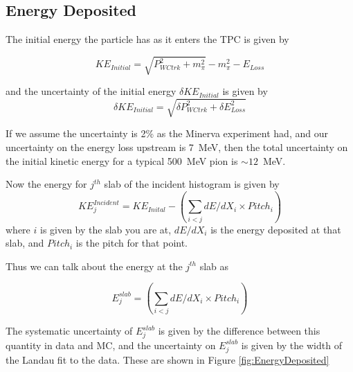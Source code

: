 \subsection{Energy Deposited}\label{sec:Energy}
The initial energy the particle has as it enters the TPC is given by

\begin{equation}
KE_{Initial} = \sqrt{P_{WCtrk}^2 + m_{\pi}^2} - m_{\pi}^2 - E_{Loss}
\end{equation}

and the uncertainty of the initial energy $\delta KE_{Initial}$ is given by
\begin{equation}
\delta KE_{Initial} = \sqrt{\delta P_{WCtrk}^2 + \delta E_{Loss}^2}
\end{equation}

If we assume the uncertainty is 2\% as the Minerva experiment had, and our uncertainty on the energy loss upstream is 7~MeV, then the total uncertainty on the initial kinetic energy for a typical 500~MeV pion is $\sim 12$~MeV.



Now the energy for $j^{th}$ slab of the incident histogram is given by
\begin{equation}
KE^{Incident}_{j} = KE_{Inital} - (\sum_{i<j} dE/dX_{i} \times Pitch_i)
\end{equation}
where $i$ is given by the slab you are at, $dE/dX_{i}$ is the energy deposited at that slab, and $Pitch_i$ is the pitch for that point. 

Thus we can talk about the energy at the $j^{th}$ slab as 

\begin{equation}
E_{j}^{slab} = (\sum_{i<j} dE/dX_{i} \times Pitch_i)
\end{equation}

The systematic uncertainty of $E_{j}^{slab}$ is given by the difference between this quantity in data and MC, and the uncertainty on $E_{j}^{slab}$ is given by the width of the Landau fit to the data. These are shown in Figure \ref{fig:EnergyDeposited}

